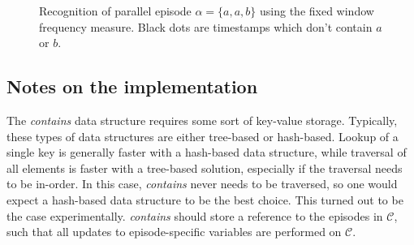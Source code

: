 \begin{figure}[t]

\caption{Recognition of parallel episode $ \alpha = \{ a, a, b \} $ using the fixed window frequency measure. Black dots are timestamps which don't contain $ a $ or $ b $.}
\label{fig:parallel-recognition}
\end{figure}

\subsection{Notes on the implementation}

The \emph{contains} data structure requires some sort of key-value storage. Typically, these types of data structures are either  tree-based or hash-based. Lookup of a single key is generally faster with a hash-based data structure, while traversal of all elements is faster with a tree-based solution, especially if the traversal needs to be in-order. In this case, \emph{contains} never needs to be traversed, so one would expect a hash-based data structure to be the best choice. This turned out to be the case experimentally. \emph{contains} should store a reference to the episodes in $ \mathcal{C} $, such that all updates to episode-specific variables are performed on $ \mathcal{C} $.

